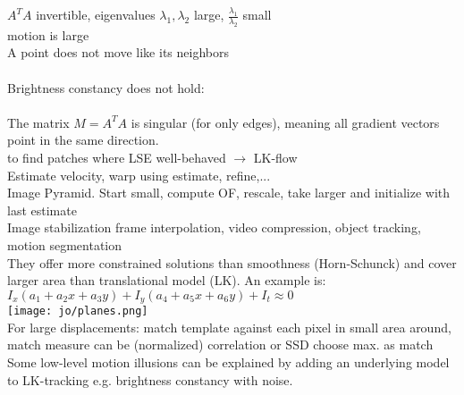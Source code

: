  $A^TA$ invertible, eigenvalues $\lambda_1, \lambda_2$ large, $\frac{\lambda_1}{\lambda_2}$ small\\
 motion is large \\
A point does not move like its neighbors \\
\\
Brightness constancy does not hold:\\
 \\
The matrix $M = A^TA$ is singular (for only edges), meaning all gradient vectors point in the same direction.\\
 to find patches where LSE well-behaved $\rightarrow$ LK-flow\\
 Estimate velocity, warp using estimate, refine,...\\
 Image Pyramid. Start small, compute OF, rescale, take larger and initialize with last estimate\\
 Image stabilization  frame interpolation, video compression, object tracking, motion segmentation\\
They offer more constrained solutions than smoothness (Horn-Schunck) and cover larger area than translational model (LK). An example is: \\
 $I_x(a_1 + a_2x + a_3y) + I_y(a_4 + a_5x + a_6y) + I_t \approx 0$ \\ \texttt{[image: jo/planes.png]}\\
 For large displacements: match template against each pixel in small area around, match measure can be (normalized) correlation or SSD choose max. as match \\
 Some low-level motion illusions can be explained by adding an underlying model to LK-tracking e.g. brightness constancy with noise.
